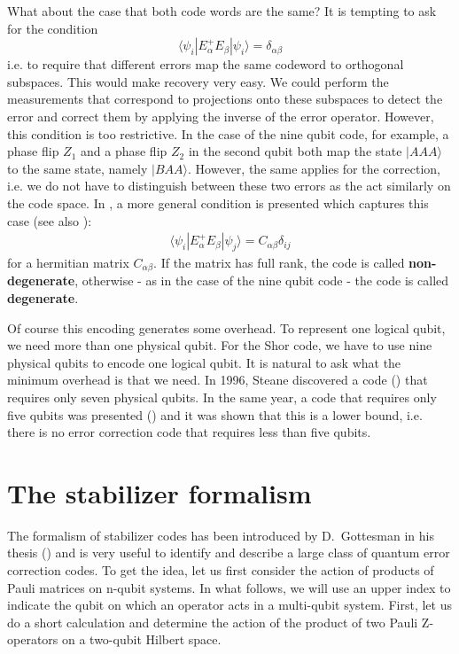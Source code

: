 \documentclass[a4paper, draft]{article}
\theoremstyle{own}
\theoremstyle{remark}
\begin{document}
What about the case that both code words are the same? It is tempting to ask for the condition
$$
\langle \psi_i | E_\alpha^{+} E_\beta | \psi_i \rangle = \delta_{\alpha \beta}
$$
i.e. to require that different errors map the same codeword to orthogonal subspaces. This would make recovery very easy. We could perform the measurements that correspond to projections onto these subspaces to detect the error and correct them by applying the inverse of the error operator. However, this condition is too restrictive. In the case of the nine qubit code, for example, a phase flip $Z_1$ and a phase flip $Z_2$ in the second qubit both map the state $|AAA \rangle$ to the same state, namely $|BAA\rangle$. However, the same applies for the correction, i.e. we do not have to distinguish between these two errors as the act similarly on the code space. In \cite{KL}, a more general condition is presented which captures this case (see also \cite{G1}):
\begin{align}\label{eq:errorcorrection}
\langle \psi_i | E_\alpha^{+}E_\beta | \psi_j \rangle = C_{\alpha\beta} \delta_{ij}
\end{align}
for a hermitian matrix $C_{\alpha \beta}$. If the matrix has full rank, the code is called {\bf non-degenerate}, otherwise - as in the case of the nine qubit code - the code is called {\bf degenerate}. 

Of course this encoding generates some overhead. To represent one logical qubit, we need more than one physical qubit. For the Shor code, we have to use nine physical qubits to encode one logical qubit. It is natural to ask what the minimum overhead is that we need. In 1996, Steane discovered a code (\cite{SteaneCode}) that  requires only seven physical qubits. In the same year, a code that requires only five qubits was presented (\cite{LMPZ96}) and it was shown that this is a lower bound, i.e. there is no error correction code that requires less than five qubits.

\section{The stabilizer formalism}

The formalism of stabilizer codes has been introduced by D.~Gottesman in his thesis (\cite{GThesis}) and is very useful to identify and describe a large class of quantum error correction codes. To get the idea, let us first consider the action of products of Pauli matrices on n-qubit systems. In what follows, we will use an upper index to indicate the qubit on which an operator acts in a multi-qubit system. First, let us do a short calculation and determine the action of the product of two Pauli Z-operators on a two-qubit Hilbert space.
\end{document}
